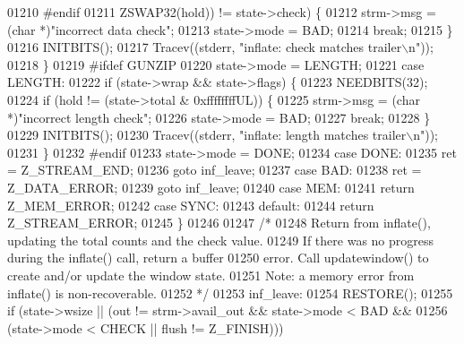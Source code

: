 \begin{DoxyCode}
{{{{{{{{{{{{01210 #endif
01211                      ZSWAP32(hold)) != state->check) \{
01212                     strm->msg = (\textcolor{keywordtype}{char} *)\textcolor{stringliteral}{"incorrect data check"};
01213                     state->mode = BAD;
01214                     \textcolor{keywordflow}{break};
01215                 \}
01216                 INITBITS();
01217                 Tracev((stderr, \textcolor{stringliteral}{"inflate:   check matches trailer\(\backslash\)n"}));
01218             \}
01219 \textcolor{preprocessor}{#ifdef GUNZIP}
01220             state->mode = LENGTH;
01221         \textcolor{keywordflow}{case} LENGTH:
01222             \textcolor{keywordflow}{if} (state->wrap && state->flags) \{
01223                 NEEDBITS(32);
01224                 \textcolor{keywordflow}{if} (hold != (state->total & 0xffffffffUL)) \{
01225                     strm->msg = (\textcolor{keywordtype}{char} *)\textcolor{stringliteral}{"incorrect length check"};
01226                     state->mode = BAD;
01227                     \textcolor{keywordflow}{break};
01228                 \}
01229                 INITBITS();
01230                 Tracev((stderr, \textcolor{stringliteral}{"inflate:   length matches trailer\(\backslash\)n"}));
01231             \}
01232 \textcolor{preprocessor}{#endif}
01233             state->mode = DONE;
01234         \textcolor{keywordflow}{case} DONE:
01235             ret = Z\_STREAM\_END;
01236             \textcolor{keywordflow}{goto} inf\_leave;
01237         \textcolor{keywordflow}{case} BAD:
01238             ret = Z\_DATA\_ERROR;
01239             \textcolor{keywordflow}{goto} inf\_leave;
01240         \textcolor{keywordflow}{case} MEM:
01241             \textcolor{keywordflow}{return} Z\_MEM\_ERROR;
01242         \textcolor{keywordflow}{case} SYNC:
01243         \textcolor{keywordflow}{default}:
01244             \textcolor{keywordflow}{return} Z\_STREAM\_ERROR;
01245         \}
01246 
01247     \textcolor{comment}{/*}
01248 \textcolor{comment}{       Return from inflate(), updating the total counts and the check value.}
01249 \textcolor{comment}{       If there was no progress during the inflate() call, return a buffer}
01250 \textcolor{comment}{       error.  Call updatewindow() to create and/or update the window state.}
01251 \textcolor{comment}{       Note: a memory error from inflate() is non-recoverable.}
01252 \textcolor{comment}{     */}
01253   inf\_leave:
01254     RESTORE();
01255     \textcolor{keywordflow}{if} (state->wsize || (out != strm->avail\_out && state->mode < BAD &&
01256             (state->mode < CHECK || flush != Z\_FINISH)))
}}}}}}}}}}}}
\end{DoxyCode}
